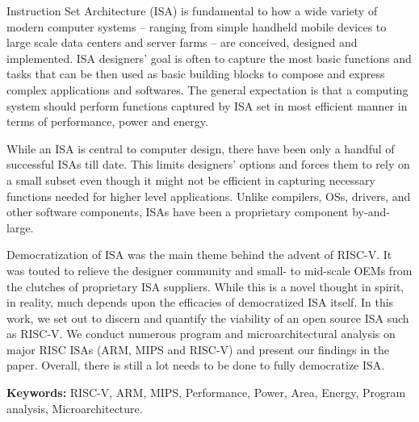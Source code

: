 

Instruction Set Architecture (ISA) is fundamental to how a wide variety of modern computer systems -- ranging from simple handheld mobile devices to large scale data centers and server farms -- are conceived, designed and implemented. ISA designers' goal is often to capture the most basic functions and tasks that can be then used as basic building blocks to compose and express complex applications and softwares. The general expectation is that a computing system should perform functions captured by ISA set in most efficient manner in terms of performance, power and energy. 

While an ISA is central to computer design, there have been only a handful of successful ISAs till date. This limits designers' options and forces them to rely on a small subset even though it might not be efficient in capturing necessary functions needed for higher level applications. Unlike compilers, OSs, drivers, and other software components, ISAs have been a proprietary component by-and-large.

Democratization of ISA was the main theme behind the advent of RISC-V. It was touted to relieve the designer community and small- to mid-scale OEMs from the clutches of proprietary ISA suppliers. While this is a novel thought in spirit, in reality, much depends upon the efficacies of democratized ISA itself. In this work, we set out to discern and quantify the viability of an open source ISA such as RISC-V. We conduct numerous program and microarchitectural analysis on major RISC ISAs (ARM, MIPS and RISC-V) and present our findings in the paper. Overall, there is still a lot needs to be done to fully democratize ISA.  

\textbf{Keywords:} RISC-V, ARM, MIPS, Performance, Power, Area, Energy, Program analysis, Microarchitecture.





